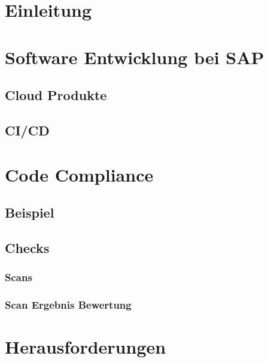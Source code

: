 \documentclass[
	12pt, %
	a4paper,
	bibliography=totoc, %
	numbers=noenddot, %
	ngerman, %
	headsepline, %
	oneside %
	]{scrbook} %
\begin{document}
\chapter{Einleitung}\label{ch:einleitung}


\chapter{Software Entwicklung bei SAP}\label{ch:sap_software_entwicklung}


\section{Cloud Produkte}\label{sec:cloud}


\section{CI/CD}\label{sec:cicd}


\chapter{Code Compliance}\label{ch:code_compliance}


\section{Beispiel}\label{sec:compliance_beispiele}


\section{Checks}\label{se~:checks}


\subsection{Scans}\label{subsec:scans}


\subsection{Scan Ergebnis Bewertung}\label{subsec:scan_bewertung}


\chapter{Herausforderungen}\label{ch:herausforderungen}

\end{document}
